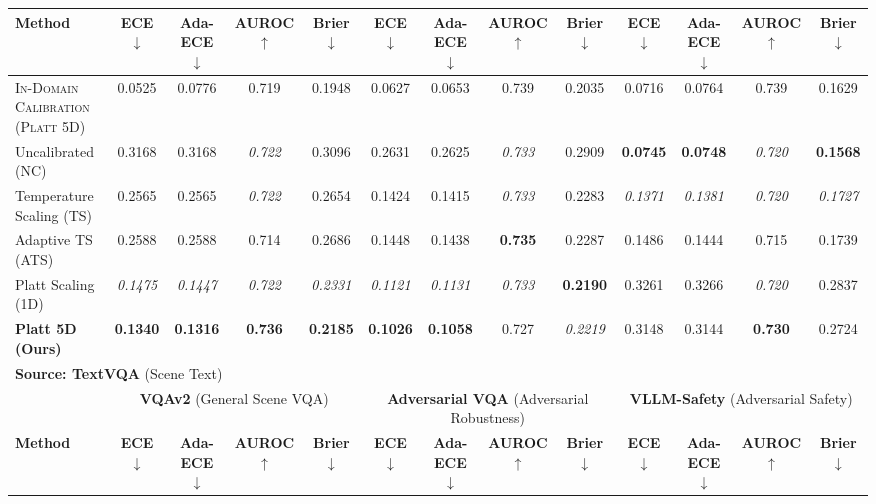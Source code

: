 \begin{table}[t]
{\begin{tabular}{l cccc cccc cccc}
\cmidrule(lr){2-5} \cmidrule(lr){6-9} \cmidrule(lr){10-13}
\textbf{Method} & \textbf{ECE} $\downarrow$ & \textbf{Ada-ECE} $\downarrow$ & \textbf{AUROC} $\uparrow$ & \textbf{Brier} $\downarrow$ & \textbf{ECE} $\downarrow$ & \textbf{Ada-ECE} $\downarrow$ & \textbf{AUROC} $\uparrow$ & \textbf{Brier} $\downarrow$ & \textbf{ECE} $\downarrow$ & \textbf{Ada-ECE} $\downarrow$ & \textbf{AUROC} $\uparrow$ & \textbf{Brier} $\downarrow$ \\
\midrule
\textsc{In-Domain Calibration (Platt 5D)} & 0.0525 & 0.0776 & 0.719 & 0.1948 & 0.0627 & 0.0653 & 0.739 & 0.2035 & 0.0716 & 0.0764 & 0.739 & 0.1629 \\
Uncalibrated (NC) & 0.3168 & 0.3168 & \textit{0.722} & 0.3096 & 0.2631 & 0.2625 & \textit{0.733} & 0.2909 & \textbf{0.0745} & \textbf{0.0748} & \textit{0.720} & \textbf{0.1568} \\
Temperature Scaling (TS) & 0.2565 & 0.2565 & \textit{0.722} & 0.2654 & 0.1424 & 0.1415 & \textit{0.733} & 0.2283 & \textit{0.1371} & \textit{0.1381} & \textit{0.720} & \textit{0.1727} \\
Adaptive TS (ATS) & 0.2588 & 0.2588 & 0.714 & 0.2686 & 0.1448 & 0.1438 & \textbf{0.735} & 0.2287 & 0.1486 & 0.1444 & 0.715 & 0.1739 \\
Platt Scaling (1D) & \textit{0.1475} & \textit{0.1447} & \textit{0.722} & \textit{0.2331} & \textit{0.1121} & \textit{0.1131} & \textit{0.733} & \textbf{0.2190} & 0.3261 & 0.3266 & \textit{0.720} & 0.2837 \\
\textbf{Platt 5D (Ours)} & \textbf{0.1340} & \textbf{0.1316} & \textbf{0.736} & \textbf{0.2185} & \textbf{0.1026} & \textbf{0.1058} & 0.727 & \textit{0.2219} & 0.3148 & 0.3144 & \textbf{0.730} & 0.2724 \\
\midrule
\multicolumn{13}{l}{\textbf{Source: TextVQA} (Scene Text)} \\
\midrule
 & \multicolumn{4}{c}{\textbf{VQAv2} (General Scene VQA)} & \multicolumn{4}{c}{\textbf{Adversarial VQA} (Adversarial Robustness)} & \multicolumn{4}{c}{\textbf{VLLM-Safety} (Adversarial Safety)} \\
\cmidrule(lr){2-5} \cmidrule(lr){6-9} \cmidrule(lr){10-13}
\textbf{Method} & \textbf{ECE} $\downarrow$ & \textbf{Ada-ECE} $\downarrow$ & \textbf{AUROC} $\uparrow$ & \textbf{Brier} $\downarrow$ & \textbf{ECE} $\downarrow$ & \textbf{Ada-ECE} $\downarrow$ & \textbf{AUROC} $\uparrow$ & \textbf{Brier} $\downarrow$ & \textbf{ECE} $\downarrow$ & \textbf{Ada-ECE} $\downarrow$ & \textbf{AUROC} $\uparrow$ & \textbf{Brier} $\downarrow$ \\

\end{tabular}}
\end{table}
